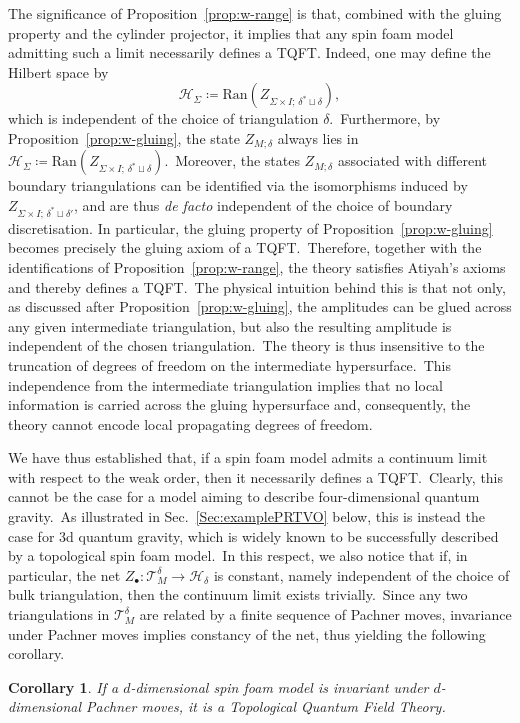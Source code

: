 \documentclass[11pt]{article}
\newtheorem{corollary}[proposition]{Corollary}
\theoremstyle{definition}
\numberwithin{equation}{section}
\begin{document}
The significance of Proposition~\ref{prop:w-range} is that, combined with the gluing property and the cylinder projector, it implies that any spin foam model admitting such a limit necessarily defines a TQFT. Indeed, one may define the Hilbert space by
\[
\mathcal{H}_\Sigma \coloneqq \mathrm{Ran}(Z_{\Sigma \times I;\,\delta^* \sqcup \delta}),
\]
which is independent of the choice of triangulation $\delta$.~Furthermore, by Proposition~\ref{prop:w-gluing}, the state $Z_{M;\delta}$ always lies in $\mathcal{H}_\Sigma \coloneqq\mathrm{Ran}(Z_{\Sigma \times I;\,\delta^* \sqcup \delta})$.~Moreover, the states $Z_{M;\delta}$ associated with different boundary triangulations can be identified via the isomorphisms induced by $Z_{\Sigma \times I;\,\delta^* \sqcup \delta'}$, and are thus \emph{de facto} independent of the choice of boundary discretisation. In particular, the gluing property of Proposition~\ref{prop:w-gluing} becomes precisely the gluing axiom of a TQFT.~Therefore, together with the identifications of Proposition~\ref{prop:w-range}, the theory satisfies Atiyah's axioms and thereby defines a TQFT.~The physical intuition behind this is that not only, as discussed after Proposition~\ref{prop:w-gluing}, the amplitudes can be glued across any given intermediate triangulation, but also the resulting amplitude is independent of the chosen triangulation.~The theory is thus insensitive to the truncation of degrees of freedom on the intermediate hypersurface.~This independence from the intermediate triangulation implies that no local information is carried across the gluing hypersurface and, consequently, the theory cannot encode local propagating degrees of freedom.

We have thus established that, if a spin foam model admits a continuum limit with respect to the weak order, then it necessarily defines a TQFT.~Clearly, this cannot be the case for a model aiming to describe four-dimensional quantum gravity.~As illustrated in Sec.~\ref{Sec:examplePRTVO} below, this is instead the case for 3d quantum gravity, which is widely known to be successfully described by a topological spin foam model.~In this respect, we also notice that if, in particular, the net $Z_\bullet \colon \mathcal{T}_M^\delta \to \mathcal{H}_\delta$ is constant, namely independent of the choice of bulk triangulation, then the continuum limit exists trivially.~Since any two triangulations in $\mathcal{T}_M^\delta$ are related by a finite sequence of Pachner moves, invariance under Pachner moves implies constancy of the net, thus yielding the following corollary.
\begin{corollary}\label{cor:PachnerInv}
    If a $d$-dimensional spin foam model is invariant under $d$-dimensional Pachner moves, it is a Topological Quantum Field Theory.
\end{corollary}
\end{document}
